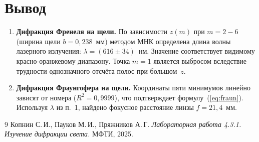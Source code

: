 \documentclass[twoside]{mfitjournal}
\begin{document}
\section*{Вывод}

\begin{enumerate}
    \item \textbf{Дифракция Френеля на щели.}
        По зависимости $z(m)$ при $m = 2{-}6$ (ширина щели
        $b = 0{,}238$~мм) методом МНК определена длина волны лазерного
        излучения: $\lambda = (616 \pm 34)$~нм.
        Значение соответствует видимому красно-оранжевому диапазону.
        Точка $m = 1$ является выбросом вследствие трудности однозначного
        отсчёта полос при большом~$z$.

    \item \textbf{Дифракция Фраунгофера на щели.}
        Координаты пяти минимумов линейно зависят от номера ($R^2 = 0{,}9999$),
        что подтверждает формулу~(\ref{eq:fraun}).
        Используя $\lambda$ из п.~1, найдено фокусное расстояние
        линзы $f = 21{,}4$~мм.
\end{enumerate}

\begin{thebibliography}{9}
    Копнин С.\,И., Пауков М.\,И., Пряжников А.\,Г.
    \textit{Лабораторная работа 4.3.1. Изучение дифракции света.}
    МФТИ, 2025.
\end{thebibliography}
\end{document}
